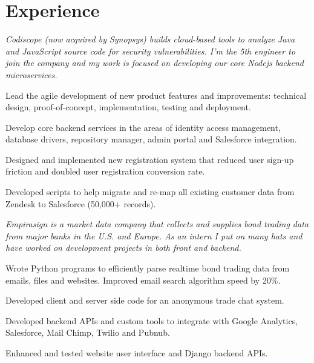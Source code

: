 \documentclass[letterpaper]{deedy-resume} %
\begin{document}
\begin{minipage}[t]{0.66\textwidth} %


\section{Experience}

\textit{Codiscope (now acquired by Synopsys) builds cloud-based tools to analyze Java and JavaScript source code for security vulnerabilities. I'm the 5th engineer to join the company and my work is focused on developing our core Nodejs backend microservices.}
\vspace{3.5mm} %
\begin{tightitemize}
\item Lead the agile development of new product features and improvements: technical design, proof-of-concept, implementation, testing and deployment.
\item Develop core backend services in the areas of identity access management, database drivers, repository manager, admin portal and Salesforce integration.
\item Designed and implemented new registration system that reduced user sign-up friction and doubled user registration conversion rate.
\item Developed scripts to help migrate and re-map all existing customer data from Zendesk to Salesforce (50,000+ records).
\end{tightitemize}

\sectionspace %


\textit{Empirasign is a market data company that collects and supplies bond trading data from major banks in the U.S. and Europe. As an intern I put on many hats and have worked on development projects in both front and backend.}
\vspace{0.75mm}
\begin{tightitemize}
\item Wrote Python programs to efficiently parse realtime bond trading data from emails, files and websites. Improved email search algorithm speed by 20\%.
\item Developed client and server side code for an anonymous trade chat system.
\item Developed backend APIs and custom tools to integrate with Google Analytics, Salesforce, Mail Chimp, Twilio and Pubnub.
\item Enhanced and tested website user interface and Django backend APIs.
\end{tightitemize}


\end{minipage}
\end{document}
